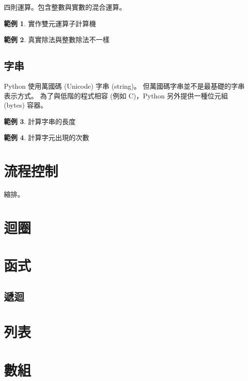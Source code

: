 \documentclass[a4paper,12pt]{book}
\theoremstyle{definition}
\newtheorem{example}{範例}[chapter]
\begin{document}
四則運算。包含整數與實數的混合運算。

\begin{example}
實作雙元運算子計算機
\end{example}

\begin{example}
真實除法與整數除法不一樣
\end{example}

\section{字串}

Python 使用萬國碼 (Unicode) 字串 (string)。
但萬國碼字串並不是最基礎的字串表示方式。
為了與低階的程式相容 (例如 C)，Python 另外提供一種位元組 (bytes) 容器。

\begin{example}
計算字串的長度
\end{example}

\begin{example}
計算字元出現的次數
\end{example}

\chapter{流程控制}
%
\label{c:flow}

縮排。

\chapter{迴圈}
%
\label{c:loop}

\chapter{函式}
%
\label{c:function}

\section{遞迴}

\chapter{列表}
%
\label{c:list}

\chapter{數組}
%
\label{c:tuple}
\end{document}
